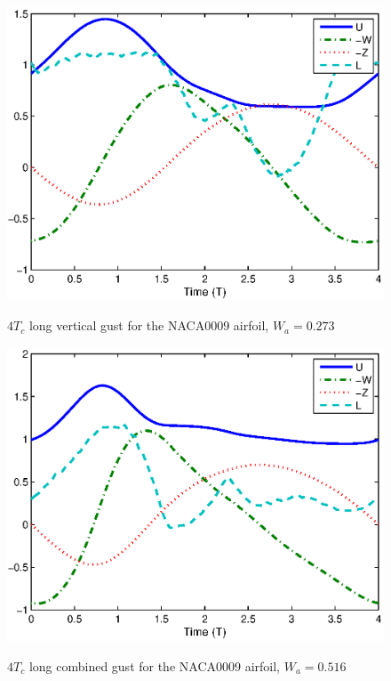 \begin{figure}
  \begin{center}
   \scalebox{1.0}
   {\includegraphics{./Figures/Windtype=1_Tg=4_Wg=0p273_LUTNACA0009_alphamax=5_dalphadt=50.eps}}
      \end{center}
      \caption{$4T_c$ long vertical gust for the NACA0009 airfoil, $W_a=0.273$}
  \label{fig:vertical_optimization_UAV}
\end{figure}

\FloatBarrier

\begin{figure}[h]
  \begin{center}
    \scalebox{1.0}
    {\includegraphics{./Figures/Windtype=3_Tg=4_Wg=0p516_LUTNACA0009_alphamax=12_dalphadt=50.eps}}
      \end{center}
      \caption{$4T_c$ long combined gust for the NACA0009 airfoil, $W_a=0.516$}
  \label{fig:combined_optimization_UAV}
\end{figure}


